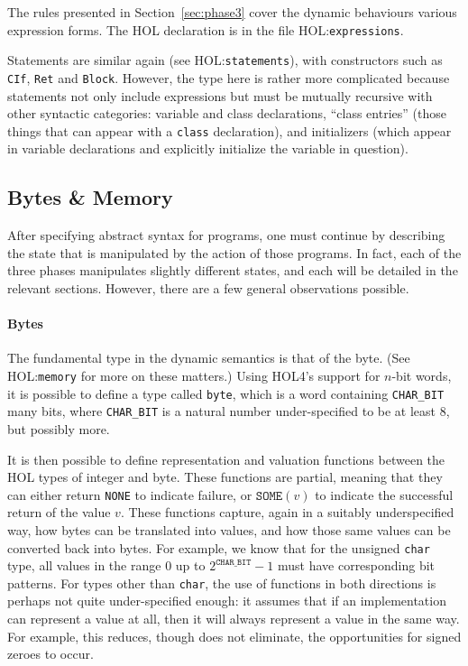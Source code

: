 \documentclass[11pt]{article}
\newcommand{\HOLfile}[1]{HOL:\texttt{#1}}
\begin{document}
The rules presented in Section~\ref{sec:phase3} cover the dynamic
behaviours various expression forms.  The HOL declaration is in the
file \HOLfile{expressions}.

Statements are similar again (see \HOLfile{statements}), with
constructors such as \texttt{CIf}, \texttt{Ret} and \texttt{Block}.
However, the type here is rather more complicated because statements
not only include expressions but must be mutually recursive with other
syntactic categories: variable and class declarations, ``class
entries'' (those things that can appear with a \texttt{class}
declaration), and initializers (which appear in variable declarations
and explicitly initialize the variable in question).

\subsection{Bytes \& Memory}
\label{sec:bytes-memory-states}

After specifying abstract syntax for programs, one must continue by
describing the state that is manipulated by the action of those
programs.   In fact, each of the three phases manipulates slightly
different states, and each will be detailed in the relevant sections.
However, there are a few general observations possible.

\paragraph{Bytes} The fundamental type in the dynamic semantics is
that of the byte.  (See \HOLfile{memory} for more on these matters.)
Using HOL4's support for $n$-bit words, it is possible to define a
type called \texttt{byte}, which is a word containing
\texttt{CHAR_BIT} many bits, where \texttt{CHAR_BIT} is a natural
number under-specified to be at least 8, but possibly more.

It is then possible to define representation and valuation functions
between the HOL types of integer and byte.  These functions are
partial, meaning that they can either return \texttt{NONE} to indicate
failure, or $\texttt{SOME}(v)$ to indicate the successful return of
the value $v$.  These functions capture, again in a suitably
underspecified way, how bytes can be translated into values, and how
those same values can be converted back into bytes.  For example, we
know that for the unsigned \texttt{char} type, all values in the range
$0$ up to $2^{\texttt{CHAR_BIT}}-1$ must have corresponding bit
patterns.  For types other than \texttt{char}, the use of functions in
both directions is perhaps not quite under-specified enough: it
assumes that if an implementation can represent a value at all, then
it will always represent a value in the same way.  For example, this
reduces, though does not eliminate, the opportunities for signed
zeroes to occur.
\end{document}
